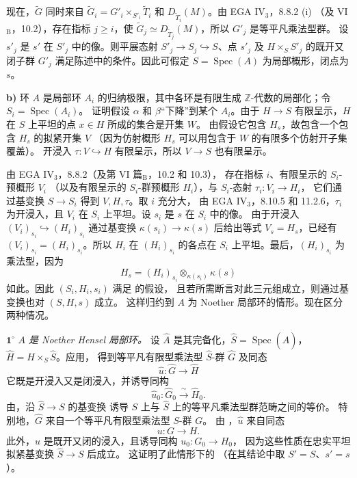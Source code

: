 现在，\(\widetilde G\) 同时来自 \(\widetilde G_i=G'_i\times_{S'_i}\widetilde T_i\)
和 \(D_{\widetilde T_i}(M)\)。由 EGA IV\(_3\)，8.8.2 (i)
（及 VI\(_{\mathrm B}\)，10.2），存在指标 \(j\geq i\)，使
\(\widetilde G_j\simeq D_{\widetilde T_j}(M)\)，所以 \(G'_j\) 是等平凡乘法型群。
设 \(s'_j\) 是 \(s'\) 在 \(S'_j\) 中的像。则平展态射
\(S'_j\to S_j\hookrightarrow S\)、点 \(s'_j\) 及 \(H\times_S S'_j\)
的既开又闭子群 \(G'_j\) 满足陈述中的条件。因此可假定 \(S=\operatorname{Spec}(A)\)
为局部概形，闭点为 \(s\)。

\par\smallskip\noindent
\textbf{b)}
环 \(A\) 是局部环 \(A_i\) 的归纳极限，其中各环是有限生成
\(\mathbb Z\)-代数的局部化；令 \(S_i=\operatorname{Spec}(A_i)\)。
证明假设 \(\alpha\) 和 \(\beta\)“下降”到某个 \(A_i\)。由于 \(H\to S\)
有限呈示，\(H\) 在 \(S\) 上平坦的点 \(x\in H\) 所成的集合是开集 \(W\)。
由假设它包含 \(H_s\)，故包含一个包含 \(H_s\) 的拟紧开集 \(V\)
（因为仿射概形 \(H_s\) 可以用包含于 \(W\) 的有限多个仿射开子集覆盖）。
开浸入 \(\tau:V\hookrightarrow H\) 有限呈示，所以 \(V\to S\) 也有限呈示。

由 EGA IV\(_3\)，8.8.2（及第 VI 篇\(_{\mathrm B}\)，10.2 和 10.3），
存在指标 \(i\)、有限呈示的 \(S_i\)-预概形 \(V_i\)
（以及有限呈示的 \(S_i\)-群预概形 \(H_i\)），与 \(S_i\)-态射 \(\tau_i:V_i\to H_i\)，
它们通过基变换 \(S\to S_i\) 得到 \(V,H,\tau\)。取 \(i\) 充分大，
由 EGA IV\(_3\)，8.10.5 和 11.2.6，\(\tau_i\) 为开浸入，且 \(V_i\) 在
\(S_i\) 上平坦。设 \(s_i\) 是 \(s\) 在 \(S_i\) 中的像。
由于开浸入 \((V_i)_{s_i}\hookrightarrow(H_i)_{s_i}\) 通过基变换
\(\kappa(s_i)\to\kappa(s)\) 后给出等式 \(V_s=H_s\)，已经有
\((V_i)_{s_i}=(H_i)_{s_i}\)。所以 \(H_i\) 在 \((H_i)_{s_i}\) 的各点在
\(S_i\) 上平坦。最后，\((H_i)_{s_i}\) 为乘法型，因为
\[
  H_s=(H_i)_{s_i}\otimes_{\kappa(s_i)}\kappa(s)
\]
如此。因此 \((S_i,H_i,s_i)\) 满足  的假设，
且若所需断言对此三元组成立，则通过基变换也对 \((S,H,s)\) 成立。
这样归约到 \(A\) 为 Noether 局部环的情形。现在区分两种情况。

\par\smallskip\noindent
\(\mathbf{1^\circ}\) \emph{\(A\) 是 Noether Hensel 局部环。}
设 \(\widehat A\) 是其完备化，\(\widehat S=\operatorname{Spec}(\widehat A)\)，
\(\widehat H=H\times_S\widehat S\)。应用，
得到等平凡有限型乘法型 \(\widehat S\)-群 \(\widehat G\) 及同态
\[
  \widehat u:\widehat G\longrightarrow\widehat H
\]
它既是开浸入又是闭浸入，并诱导同构
\[
  \widehat u_0:\widehat G_0\xrightarrow{\ \sim\ }\widehat H_0.
\]
由，沿 \(\widehat S\to S\) 的基变换
诱导 \(S\) 上与 \(\widehat S\) 上的等平凡乘法型群范畴之间的等价。
特别地，\(\widehat G\) 来自一个等平凡有限型乘法型 \(S\)-群 \(G\)。
由 ，\(\widehat u\) 来自同态
\[
  u:G\longrightarrow H.
\]
此外，\(u\) 是既开又闭的浸入，且诱导同构 \(u_0:G_0\to H_0\)，
因为这些性质在忠实平坦拟紧基变换 \(\widehat S\to S\) 后成立。
这证明了此情形下的 
（在其结论中取 \(S'=S\)、\(s'=s\)）。

